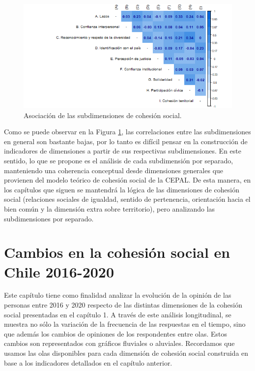 \documentclass[
  12pt,
]{book}
\begin{document}
\begin{figure}[H]

{\centering \includegraphics[width=1\linewidth,height=1\textheight]{output/graphs/cohesion_social_cor} 

}

\caption{Asociación de las subdimensiones de cohesión social.}\label{fig:cohesion-social-cor}
\end{figure}

Como se puede observar en la Figura \ref{fig:cohesion-social-cor}, las correlaciones entre las subdimensiones en general son bastante bajas, por lo tanto es difícil pensar en la construcción de indicadores de dimensiones a partir de sus respectivas subdimensiones. En este sentido, lo que se propone es el análisis de cada subdimensión por separado, manteniendo una coherencia conceptual desde dimensiones generales que provienen del modelo teórico de cohesión social de la CEPAL. De esta manera, en los capítulos que siguen se mantendrá la lógica de las dimensiones de cohesión social (relaciones sociales de igualdad, sentido de pertenencia, orientación hacia el bien común y la dimensión extra sobre territorio), pero analizando las subdimensiones por separado.

\hypertarget{cambios-en-la-cohesiuxf3n-social-en-chile-2016-2020}{%
\chapter{Cambios en la cohesión social en Chile 2016-2020}\label{cambios-en-la-cohesiuxf3n-social-en-chile-2016-2020}}

Este capítulo tiene como finalidad analizar la evolución de la opinión de las personas entre 2016 y 2020 respecto de las distintas dimensiones de la cohesión social presentadas en el capítulo 1. A través de este análisis longitudinal, se muestra no sólo la variación de la frecuencia de las respuestas en el tiempo, sino que además los cambios de opiniones de los respondentes entre olas. Estos cambios son representados con gráficos fluviales o aluviales. Recordamos que usamos las olas disponibles para cada dimensión de cohesión social construida en base a los indicadores detallados en el capítulo anterior.
\end{document}
